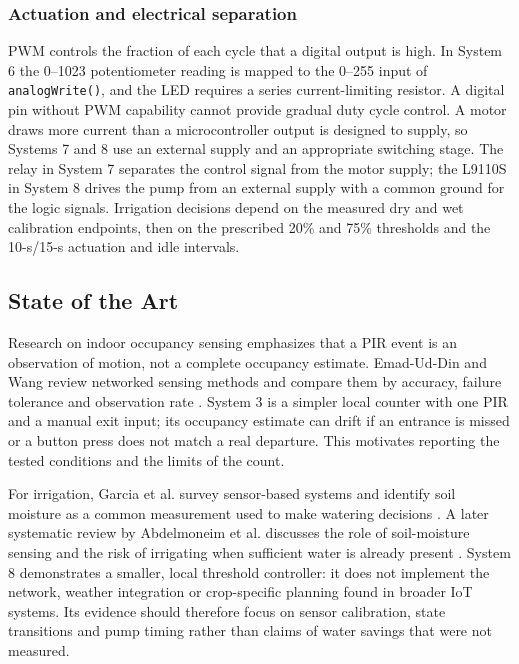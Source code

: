 \subsubsection{Actuation and electrical separation}
PWM controls the fraction of each cycle that a digital output is high. In
System 6 the 0--1023 potentiometer reading is mapped to the 0--255 input of
\texttt{analogWrite()}, and the LED requires a series current-limiting
resistor. A digital pin without PWM capability cannot provide gradual duty
cycle control. A motor draws more current than a microcontroller output is
designed to supply, so Systems 7 and 8 use an external supply and an
appropriate switching stage. The relay in System 7 separates the control
signal from the motor supply; the L9110S in System 8 drives the pump from
an external supply with a common ground for the logic signals. Irrigation
decisions depend on the measured dry and wet calibration endpoints, then on
the prescribed 20\% and 75\% thresholds and the 10-s/15-s actuation and
idle intervals.

\subsection{State of the Art}

Research on indoor occupancy sensing emphasizes that a PIR event is an
observation of motion, not a complete occupancy estimate. Emad-Ud-Din and
Wang review networked sensing methods and compare them by accuracy, failure
tolerance and observation rate \cite{emad2023}. System 3 is a simpler local
counter with one PIR and a manual exit input; its occupancy estimate can drift
if an entrance is missed or a button press does not match a real departure.
This motivates reporting the tested conditions and the limits of the count.

For irrigation, Garcia et al. survey sensor-based systems and identify soil
moisture as a common measurement used to make watering decisions
\cite{garcia2020}. A later systematic review by Abdelmoneim et al. discusses
the role of soil-moisture sensing and the risk of irrigating when sufficient
water is already present \cite{abdelmoneim2025}. System 8 demonstrates a
smaller, local threshold controller: it does not implement the network,
weather integration or crop-specific planning found in broader IoT systems.
Its evidence should therefore focus on sensor calibration, state transitions
and pump timing rather than claims of water savings that were not measured.
